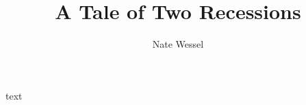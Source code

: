 \documentclass[12px]{report}
\title{A Tale of Two Recessions}
\author{Nate Wessel}
\begin{document}
	\maketitle

	text
	
\end{document}
